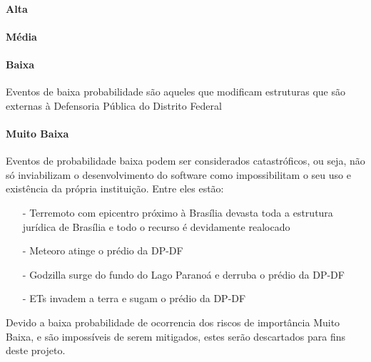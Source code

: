 \documentclass[12pt,a4paper]{report}
\begin{document}
\paragraph{Alta}

\paragraph{Média}

\paragraph{Baixa} Eventos de baixa probabilidade são aqueles que modificam estruturas que são externas à Defensoria Pública do Distrito Federal

\paragraph{Muito Baixa} Eventos de probabilidade baixa podem ser considerados catastróficos, ou seja, não só inviabilizam o desenvolvimento do software como impossibilitam o seu uso e existência da própria instituição. Entre eles estão:
\begin{itemize}
\item [-] Terremoto com epicentro próximo à Brasília devasta toda a estrutura jurídica de Brasília e todo o recurso é devidamente realocado
\item [-] Meteoro atinge o prédio da DP-DF
\item [-] Godzilla surge do fundo do Lago Paranoá e derruba o prédio da DP-DF
\item [-] ETs invadem a terra e sugam o prédio da DP-DF
\end{itemize}


Devido a baixa probabilidade de ocorrencia dos riscos de importância Muito Baixa, e são impossíveis de serem mitigados, estes serão descartados para fins deste projeto. 

\end{document}
